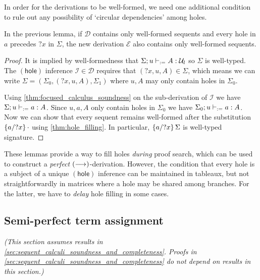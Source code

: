 \documentclass[twoside]{report}
\begin{document}
In order for the derivations to be well-formed, we need one additional condition to rule out any possibility of `circular dependencies' among holes. %

\begin{proposition}
    \label{thm:focused_calculus_hole_filling_well_formed}
    In the previous lemma, if $\mathcal D$ contains only well-formed sequents and every hole in $a$ precedes ${?x}$ in $\Sigma$, the new derivation $\mathcal E$ also contains only well-formed sequents.
\end{proposition}

\begin{proof}
    It is implied by well-formedness that $\Sigma; u \vdashd A : \mathcal U_l$ so $\Sigma$ is well-typed. The $(\mathsf{hole})$ inference $\mathcal I \in \mathcal D$ requires that $({?x}, u, A) \in \Sigma$, which means we can write $\Sigma = (\Sigma_0, ({?x}, u, A), \Sigma_1)$ where $u, A$ may only contain holes in $\Sigma_0$.

    Using \cref{thm:focused_calculus_soundness} on the sub-derivation of $\mathcal I$ we have $\Sigma; u \vdashd a : A$. Since $u, a, A$ only contain holes in $\Sigma_0$ we have $\Sigma_0; u \vdashd a : A$. Now we can show that every sequent remains well-formed after the substitution $\subst {?x} {a} \cdot$ using \cref{thm:hole_filling}. In particular, $\subst {?x} {a} \Sigma$ is well-typed signature.
\end{proof}

These lemmas provide a way to fill holes \emph{during} proof search, which can be used to construct a \emph{perfect} $(\vdashf)$-derivation. However, the condition that every hole is a subject of a unique $(\mathsf{hole})$ inference can be maintained in tableaux, but not straightforwardly in matrices where a hole may be shared among branches. For the latter, we have to \emph{delay} hole filling in some cases.

\subsection*{Semi-perfect term assignment}

\emph{(This section assumes results in \cref{sec:sequent_calculi_soundness_and_completeness}. Proofs in \cref{sec:sequent_calculi_soundness_and_completeness} do not depend on results in this section.)}
\end{document}
